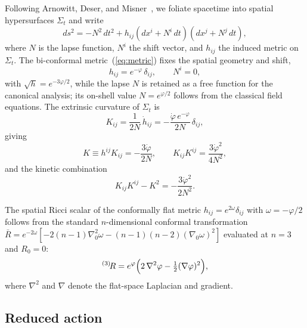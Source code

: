 \documentclass[aps,prd,onecolumn,superscriptaddress,nofootinbib,showpacs,12pt,notitlepage]{revtex4-2}
\begin{document}
Following Arnowitt, Deser, and Misner~\cite{ADM1962}, we
foliate spacetime into spatial hypersurfaces $\Sigma_t$
and write
\begin{equation}\label{eq:adm_metric}
  ds^2 = -N^2\,dt^2
    + h_{ij}(dx^i + N^i\,dt)(dx^j + N^j\,dt),
\end{equation}
where $N$ is the lapse function, $N^i$ the shift vector,
and $h_{ij}$ the induced metric on $\Sigma_t$.
The bi-conformal metric~(\ref{eq:metric}) fixes the spatial
geometry and shift,
\begin{equation}\label{eq:adm_biconformal}
  h_{ij} = e^{-\varphi}\,\delta_{ij},\qquad N^i = 0,
\end{equation}
with $\sqrt{h} = e^{-3\varphi/2}$, while the lapse $N$ is
retained as a free function for the canonical analysis;
its on-shell value $N = e^{\varphi/2}$ follows from the
classical field equations.  The extrinsic curvature
of $\Sigma_t$ is
\begin{equation}
  K_{ij} = \frac{1}{2N}\,\dot{h}_{ij}
    = -\frac{\dot{\varphi}\,e^{-\varphi}}{2N}\,\delta_{ij},
\end{equation}
giving
\begin{equation}\label{eq:K_trace}
  K \equiv h^{ij}K_{ij} = -\frac{3\dot{\varphi}}{2N},
  \qquad
  K_{ij}K^{ij} = \frac{3\dot{\varphi}^2}{4N^2},
\end{equation}
and the kinetic combination
\begin{equation}\label{eq:K_kinetic}
  K_{ij}K^{ij} - K^2 = -\frac{3\dot{\varphi}^2}{2N^2}.
\end{equation}

The spatial Ricci scalar of the conformally flat metric
$h_{ij} = e^{2\omega}\delta_{ij}$ with $\omega = -\varphi/2$
follows from the standard $n$-dimensional conformal
transformation $\bar{R} = e^{-2\omega}[-2(n{-}1)\nabla_0^2\omega
  - (n{-}1)(n{-}2)(\nabla_0\omega)^2]$
evaluated at $n = 3$ and $R_0 = 0$:
\begin{equation}\label{eq:R3}
  {}^{(3)}\!R = e^{\varphi}\Bigl(
    2\,\nabla^2\varphi
    - \tfrac{1}{2}(\nabla\varphi)^2\Bigr),
\end{equation}
where $\nabla^2$ and $\nabla$ denote the flat-space
Laplacian and gradient.

\subsection{Reduced action}
\label{sec:reduced_action}
\end{document}
